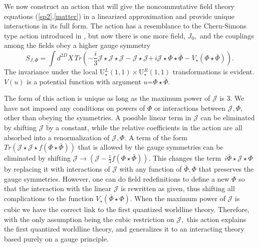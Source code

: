 \documentclass[a4paper,12pt]{article}
\begin{document}
We now construct an action that will give the noncommutative field
theory equations (\ref{sp2},\ref{matter}) in a linearized
approximation and provide unique interactions in its full form.
The action has a resemblance to the Chern-Simons type action
introduced in \cite{NCSp}, but now there is one more field,
$J_{0},$ and the couplings among the fields obey a higher gauge
symmetry
\begin{equation}
S_{J,\Phi }=\int d^{2D}X\,Tr\left( -\frac{i}{3}\mathcal{J}\star
\mathcal{J} \star \mathcal{J}-\mathcal{J}\star
\mathcal{J}\mathbf{+\,}i\mathcal{J}\star \Phi \star
\bar{\Phi}-V_{\star }\left( \Phi \star \bar{\Phi}\right) \right) .
\label{SZ}
\end{equation}
The invariance under the local U$_{\star }^{L}\left( 1,1\right)
\times $U$ _{\star }^{R}\left( 1,1\right) $ transformations is
evident. $V\left( u\right) $ is a potential function with argument
$u$=$\Phi \star \bar{\Phi}$.

The form of this action is unique as long as the maximum power of
$\mathcal{J }$ is 3. We have not imposed any conditions on powers
of $\Phi $ or interactions between $\mathcal{J},\Phi ,$ other than
obeying the symmetries. A possible linear term in $\mathcal{J}$
can be eliminated by shifting $\mathcal{J}$ by a constant, while
the relative coefficients in the action are all absorbed into a
renormalization of $\mathcal{J},\Phi $. A term of the form
$Tr\left( \mathcal{J}\star \mathcal{J}\star f\left( \Phi \star
\bar{\Phi}\right) \right) $ that is allowed by the gauge
symmetries can be eliminated by shifting $\mathcal{J}\rightarrow
\left( \mathcal{J}-\frac{1}{3}f\left( \Phi \star \bar{\Phi}\right)
\right) .$ This changes the term $\mathbf{\,}i\bar{ \Phi}\star
\mathcal{J}\star \Phi $ by replacing it with interactions of $
\mathcal{J}$ with any function of $\bar{\Phi},\Phi $ that
preserves the gauge symmetries$.$ However, one can do field
redefinitions to define a new $ \Phi $ so that the interaction
with the linear $\mathcal{J}$ is rewritten as given, thus shifting
all complications to the function $V_{\star }\left(
\bar{\Phi}\star \Phi \right) $. When the maximum power of
$\mathcal{J}$ is cubic we have the correct link to the first
quantized worldline theory. Therefore, with the only assumption
being the cubic restriction on $\mathcal{J},$ this action explains
the first quantized worldline theory, and generalizes it to an
interacting theory based purely on a gauge principle.
\end{document}
